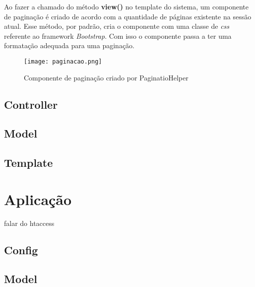 \begin{itemize}
            Ao fazer a chamado do método \textbf{view()} no template do sistema, um componente de paginação é criado de acordo com a quantidade de páginas existente na sessão atual. Esse método, por padrão, cria o componente com uma classe de \emph{css} referente ao framework \emph{Bootstrap}. Com isso o componente passa a ter uma formatação adequada para uma paginação.

            \begin{figure}[!htb]
                \centering
                \texttt{[image: paginacao.png]}
                \caption{\small Componente de paginação criado por PaginatioHelper}
                \label{cap:paginaca}
            \end{figure}

            \end{itemize}



        \subsection{Controller\label{sub:system-controller}}

        \subsection{Model\label{sub:system-model}}

        \subsection{Template\label{sub:system-template}}


    \section{Aplicação\label{sec:app}}

        falar do htaccess

        \subsection{Config\label{sec:app-config}}

        \subsection{Model\label{sec:app-model}}

